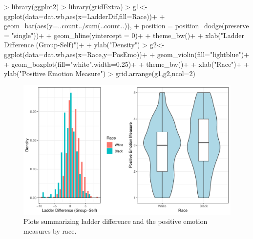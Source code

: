 \documentclass{article}
\begin{document}
\begin{enumerate}
\begin{enumerate}
\begin{Schunk}
\begin{Sinput}
> library(ggplot2)
> library(gridExtra)
> g1<-ggplot(data=dat.wb,aes(x=LadderDif,fill=Race))+
+ geom_bar(aes(y=..count../sum(..count..)),
+          position = position_dodge(preserve = "single"))+
+ geom_hline(yintercept = 0)+
+ theme_bw()+
+ xlab("Ladder Difference (Group-Self)")+
+ ylab("Density")
> g2<-ggplot(data=dat.wb,aes(x=Race,y=PosEmo))+
+ geom_violin(fill="lightblue")+
+ geom_boxplot(fill="white",width=0.25)+
+ theme_bw()+
+ xlab("Race")+
+ ylab("Positive Emotion Measure")
> grid.arrange(g1,g2,ncol=2)
\end{Sinput}
\end{Schunk}
\begin{figure}[H]
\centering
\includegraphics{finalExam-025}
\caption{Plots summarizing ladder difference and the positive emotion measures
by race.} \label{Fig:marginal1}
\end{figure}


\end{enumerate}
\end{enumerate}
\end{document}
